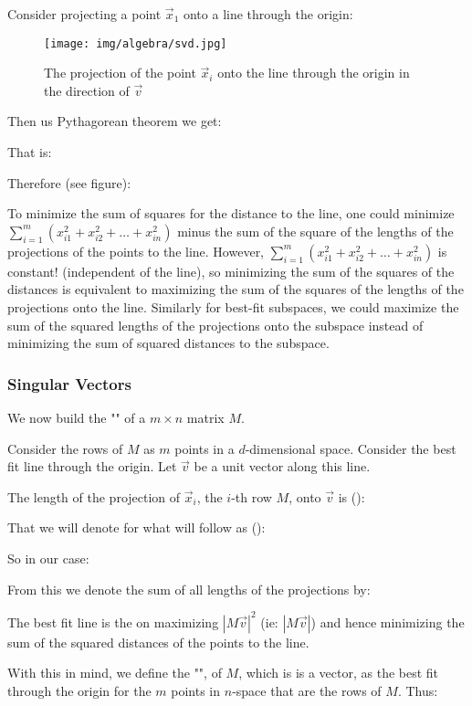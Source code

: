 	Consider projecting a point $\vec{x}_1$ onto a line through the origin:
	\begin{figure}[H]
		\centering
		\texttt{[image: img/algebra/svd.jpg]}
		\caption{The projection of the point $\vec{x}_i$ onto the line through the origin in the direction of $\vec{v}$}
	\end{figure}
	Then us Pythagorean theorem we get:
	
	That is:
	
	Therefore (see figure):
	
	To minimize the sum of squares for the distance to the line, one could minimize $\sum_{i=1}^m (x_{i1}^2+x_{i2}^2+\ldots+x_{in}^2)$ minus the sum of the square of the lengths of the projections of the points to the line. However,  $\sum_{i=1}^m (x_{i1}^2+x_{i2}^2+\ldots+x_{in}^2)$ is constant! (independent of the line), so minimizing the sum of the squares of the distances is equivalent to maximizing the sum of the squares of the lengths of the projections onto the line. Similarly for best-fit subspaces, we could maximize the sum of the squared lengths of the projections onto the subspace instead of minimizing the sum of squared distances to the subspace.
	
	\subsubsection{Singular Vectors}
	We now build the "" of a $m\times n$ matrix $M$. 

	Consider the rows of $M$ as $m$ points in a $d$-dimensional space. Consider the best fit line through the origin. Let $\vec{v}$ be a unit vector along this line.

	The length of the projection of $\vec{x}_i$, the $i$-th row $M$, onto $\vec{v}$ is ():
	
	That we will denote for what will follow as ():
	
	So in our case:
	
	From this we denote the sum of all lengths of the projections by:
	
	The best fit line is the on maximizing $|M\vec{v}|^2$ (ie: $|M\vec{v}|$) and hence minimizing the sum of the squared distances of the points to the line.
	
	With this in mind, we define the "", of $M$, which is is a vector, as the best fit through the origin for the $m$ points in $n$-space that are the rows of $M$. Thus:
	
